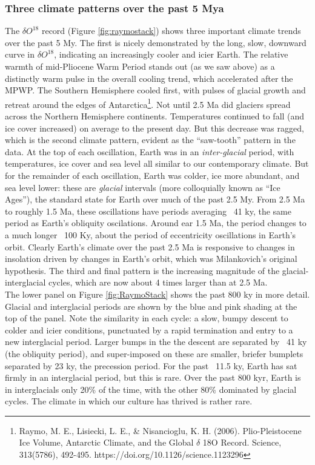 \subsubsection{Three climate patterns over the past 5 Mya}
The $\delta O^{18}$ record (Figure \ref{fig:raymostack}) shows three important climate trends over the past 5 My. The first is nicely demonstrated by the long, slow, downward curve in $\delta O^{18}$, indicating an increasingly cooler and icier Earth. The relative warmth of mid-Pliocene Warm Period stands out (as we saw above) as a distinctly warm pulse in the overall cooling trend, which accelerated after the MPWP. The Southern Hemisphere cooled first, with pulses of glacial growth and retreat around the edges of Antarctica\footnote{Raymo, M. E., Lisiecki, L. E., \& Nisancioglu, K. H. (2006). Plio-Pleistocene Ice Volume, Antarctic Climate, and the Global $\delta$ 18O Record. Science, 313(5786), 492-495. https://doi.org/10.1126/science.1123296}. Not until 2.5 Ma did glaciers spread across the Northern Hemisphere continents. Temperatures continued to fall (and ice cover increased) on average to the present day. But this decrease was ragged, which is the second climate pattern, evident as the ``saw-tooth'' pattern in the data. At the top of each oscillation, Earth was in an \emph{inter-glacial} period, with temperatures, ice cover and sea level all similar to our contemporary climate. But for the remainder of each oscillation, Earth was colder, ice more abundant, and sea level lower: these are \emph{glacial} intervals (more colloquially known as ``Ice Ages''), the standard state for Earth over much of the past 2.5 My.  From 2.5 Ma to roughly 1.5 Ma, these oscillations have periods averaging ~41 ky, the same period as Earth's obliquity oscilations. Around ear 1.5 Ma, the period changes to a much longer ~100 Ky, about the period of eccentricity oscillations in Earth's orbit. Clearly Earth's climate over the past 2.5 Ma is responsive to changes in insolation driven by changes in Earth's orbit, which was Milankovich's original hypothesis. The third and final pattern is the increasing magnitude of the glacial-interglacial cycles, which are now about 4 times larger than at 2.5 Ma.\\
The lower panel on Figure \ref{fig:RaymoStack} shows the past 800 ky in more detail. Glacial and interglacial periods are shown by the blue and pink shading at the top of the panel. Note the similarity in each cycle: a slow, bumpy descent to colder and icier conditions, punctuated by a rapid termination and entry to a new interglacial period. Larger bumps in the the descent are separated by ~41 ky (the obliquity period), and super-imposed on these are smaller, briefer bumplets separated by 23 ky, the precession period. For the past ~11.5 ky, Earth has sat firmly in an interglacial period, but this is rare. Over the past 800 kyr, Earth is in interglacials only 20\% of the time, with the other 80\% dominated by glacial cycles. The climate in which our culture has thrived is rather rare.\\
     

